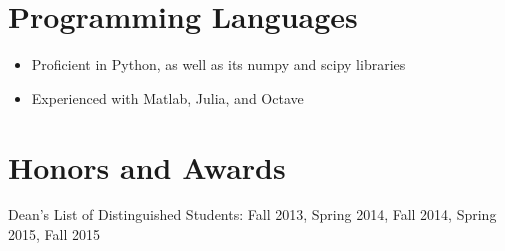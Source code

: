 \documentclass[12pt]{res}
\begin{document}
\begin{resume}
	\section{Programming Languages}
	\noindent
	\begin{itemize}
	\item Proficient in Python, as well as its numpy and scipy libraries
	\item Experienced with Matlab, Julia, and Octave
	\end{itemize}

  \vspace{-12pt}
  \section{Honors and Awards}
	\noindent
    Dean's List of Distinguished Students: Fall 2013, Spring 2014, Fall 2014, Spring 2015, Fall 2015\\

\end{resume}
\end{document}
